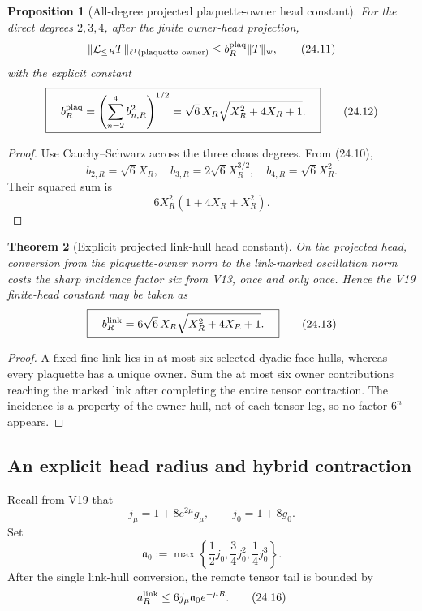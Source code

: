 \documentclass[11pt,oneside]{book}
\newtheorem{theorem}{Theorem}[chapter]
\newtheorem{proposition}[theorem]{Proposition}
\theoremstyle{definition}
\theoremstyle{remark}
\begin{document}
\begin{proposition}[All-degree projected plaquette-owner head constant]
\label{prop:e8v24-plaquette-head}
For the direct degrees \(2,3,4\), after the finite owner-head
projection,
\[
\|\mathcal L_{\leq R}T\|_{\ell^1({\rm plaquette\ owner})}
\leq b_R^{\rm plaq}\|T\|_{\rm w},                  \tag{24.11}
\]
with the explicit constant
\[
\boxed{\quad
b_R^{\rm plaq}
=\left(\sum_{n=2}^4b_{n,R}^2\right)^{1/2}
=\sqrt6\,X_R\sqrt{X_R^2+4X_R+1}.
\quad}                                             \tag{24.12}
\]
\end{proposition}

\begin{proof}
Use Cauchy--Schwarz across the three chaos degrees.  From (24.10),
\[
b_{2,R}=\sqrt6X_R,\quad
b_{3,R}=2\sqrt6X_R^{3/2},\quad
b_{4,R}=\sqrt6X_R^2.
\]
Their squared sum is
\[
6X_R^2(1+4X_R+X_R^2).
\]
\end{proof}

\begin{theorem}[Explicit projected link-hull head constant]
\label{thm:e8v24-link-head}
On the projected head, conversion from the plaquette-owner norm to the link-marked
oscillation norm costs the sharp incidence factor six from V13,
once and only once.  Hence the V19 finite-head constant may be taken
as
\[
\boxed{\quad
b_R^{\rm link}
=6\sqrt6\,X_R\sqrt{X_R^2+4X_R+1}.
\quad}                                             \tag{24.13}
\]
\end{theorem}

\begin{proof}
A fixed fine link lies in at most six selected dyadic face hulls,
whereas every plaquette has a unique owner.  Sum the at most six
owner contributions reaching the marked link after completing the
entire tensor contraction.  The incidence is a property of the owner
hull, not of each tensor leg, so no factor \(6^n\) appears.
\end{proof}

\subsection{An explicit head radius and hybrid contraction}

Recall from V19 that
\[
j_\mu=1+8e^{2\mu}g_\mu,\qquad j_0=1+8g_0.           \tag{24.14}
\]
Set
\[
\mathfrak a_0:=
\max\left\{\frac12j_0,\frac34j_0^2,\frac14j_0^3\right\}.           \tag{24.15}
\]
After the single link-hull conversion, the remote tensor tail is
bounded by
\[
                         a_R^{\rm link}
\leq6j_\mu\mathfrak a_0e^{-\mu R}.                \tag{24.16}
\]
\end{document}
